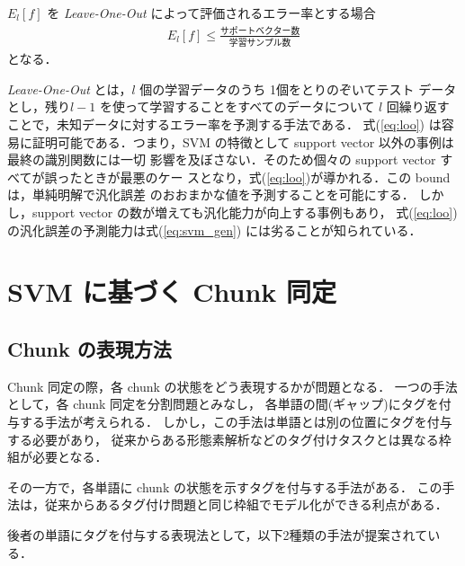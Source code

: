 \begin{theorem}[Vapnik]
$E_l[f]$ を {\it Leave-One-Out} によって評価されるエラー率とする場合
\begin{eqnarray}
E_l [f] \leq \frac{サポートベクター数}{学習サンプル数} \label{eq:loo}
\end{eqnarray}
となる．
\end{theorem}
{\it Leave-One-Out} とは，$l$ 個の学習データのうち 1個をとりのぞいてテスト
データとし，残り$l-1$ を使って学習することをすべてのデータについて $l$
回繰り返すことで，未知データに対するエラー率を予測する手法である．
式(\ref{eq:loo}) は容易に証明可能である．つまり，SVM の特徴として support vector 以外の事例は最終の識別関数には一切
影響を及ぼさない．そのため個々の support vector すべてが誤ったときが最悪のケー
スとなり，式(\ref{eq:loo})が導かれる．この bound は，単純明解で汎化誤差
のおおまかな値を予測することを可能にする．
しかし，support vector の数が増えても汎化能力が向上する事例もあり，
式(\ref{eq:loo})の汎化誤差の予測能力は式(\ref{eq:svm_gen}) には劣ることが知られている．

\vspace{-4mm}
\section{SVM に基づく Chunk 同定}
\subsection{Chunk の表現方法}
Chunk 同定の際，各 chunk の状態をどう表現するかが問題となる．
一つの手法として，各 chunk 同定を分割問題とみなし，
各単語の間(ギャップ)にタグを付与する手法が考えられる．
しかし，この手法は単語とは別の位置にタグを付与する必要があり，
従来からある形態素解析などのタグ付けタスクとは異なる枠組が必要となる．

その一方で，各単語に chunk の状態を示すタグを付与する手法がある．
この手法は，従来からあるタグ付け問題と同じ枠組でモデル化ができる利点がある．

後者の単語にタグを付与する表現法として，以下2種類の手法が提案されている．

